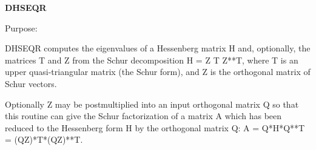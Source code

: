{\bfseries D\+H\+S\+E\+Q\+R} 

 \begin{DoxyParagraph}{Purpose\+: }
\begin{DoxyVerb}    DHSEQR computes the eigenvalues of a Hessenberg matrix H
    and, optionally, the matrices T and Z from the Schur decomposition
    H = Z T Z**T, where T is an upper quasi-triangular matrix (the
    Schur form), and Z is the orthogonal matrix of Schur vectors.

    Optionally Z may be postmultiplied into an input orthogonal
    matrix Q so that this routine can give the Schur factorization
    of a matrix A which has been reduced to the Hessenberg form H
    by the orthogonal matrix Q:  A = Q*H*Q**T = (QZ)*T*(QZ)**T.\end{DoxyVerb}
 
\end{DoxyParagraph}

